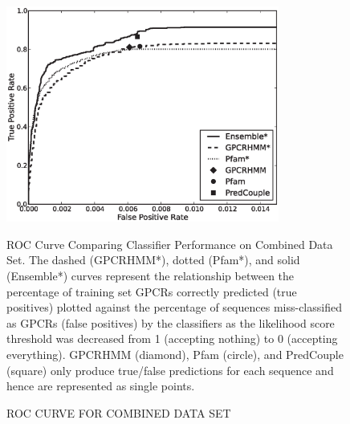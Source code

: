 \begin{figure}[H]
  \centering
  \caption{ROC CURVE FOR COMBINED DATA SET}
  \includegraphics[width=0.8\textwidth]{figures/gpcr_classifier/combined_ensembl_roc.eps}
  
ROC Curve Comparing Classifier Performance on Combined Data Set. The dashed (GPCRHMM*), dotted (Pfam*), and solid (Ensemble*) curves represent the relationship between the percentage of training set GPCRs correctly predicted (true positives) plotted against the percentage of sequences miss-classified as GPCRs (false positives) by the classifiers as the likelihood score threshold was decreased from 1 (accepting nothing) to 0 (accepting everything). GPCRHMM (diamond), Pfam (circle), and PredCouple (square) only produce true/false predictions for each sequence and hence are represented as single points.
\label{fig:combined-roc-curve}
\end{figure}

